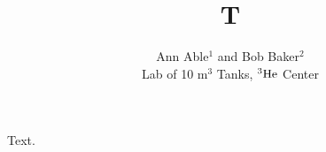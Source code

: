 \documentclass{article}
\begin{document}
\title{T}
\author{Ann Able$^{1}$ and Bob Baker$^{2}$\\ Lab of 10 m$^{3}$ Tanks, ${\rm ^{3}He}$ Center}
\maketitle
Text.
\end{document}
